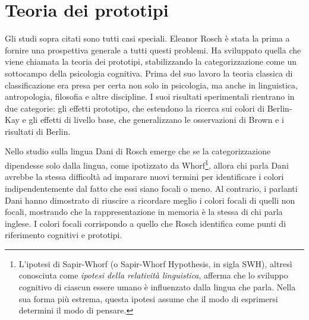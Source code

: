 \section{Teoria dei prototipi}
Gli studi sopra citati sono tutti casi speciali. Eleanor Rosch è stata la prima a fornire una prospettiva generale a tutti questi problemi. Ha sviluppato quella che viene chiamata  la teoria dei prototipi, stabilizzando la categorizzazione come un sottocampo della psicologia cognitiva. Prima del suo lavoro la teoria classica di classificazione era presa per certa non solo in psicologia, ma anche in linguistica, antropologia, filosofia e altre discipline. I suoi risultati sperimentali rientrano in due categorie: gli effetti prototipo, che estendono la ricerca sui colori di Berlin-Kay e gli effetti di livello base, che generalizzano le osservazioni di Brown e i risultati di Berlin.

Nello studio sulla lingua Dani di Rosch emerge che se la categorizzazione dipendesse solo dalla lingua, come ipotizzato da Whorf\footnote{L'ipotesi di Sapir-Whorf (o Sapir-Whorf Hypothesis, in sigla SWH), altresì conosciuta come \emph{ipotesi della relatività linguistica}, afferma che lo sviluppo cognitivo di ciascun essere umano è influenzato dalla lingua che parla. Nella sua forma più estrema, questa ipotesi assume che il modo di esprimersi determini il modo di pensare.}, allora chi parla Dani avrebbe la stessa difficoltà ad imparare nuovi termini per identificare i colori indipendentemente dal fatto che essi siano focali o meno. Al contrario, i parlanti Dani hanno dimostrato di riuscire a ricordare meglio i colori focali di quelli non focali, mostrando che la rappresentazione in memoria è la stessa di chi parla inglese. I colori focali corrispondo a quello che Rosch identifica come punti di riferimento cognitivi e prototipi.

